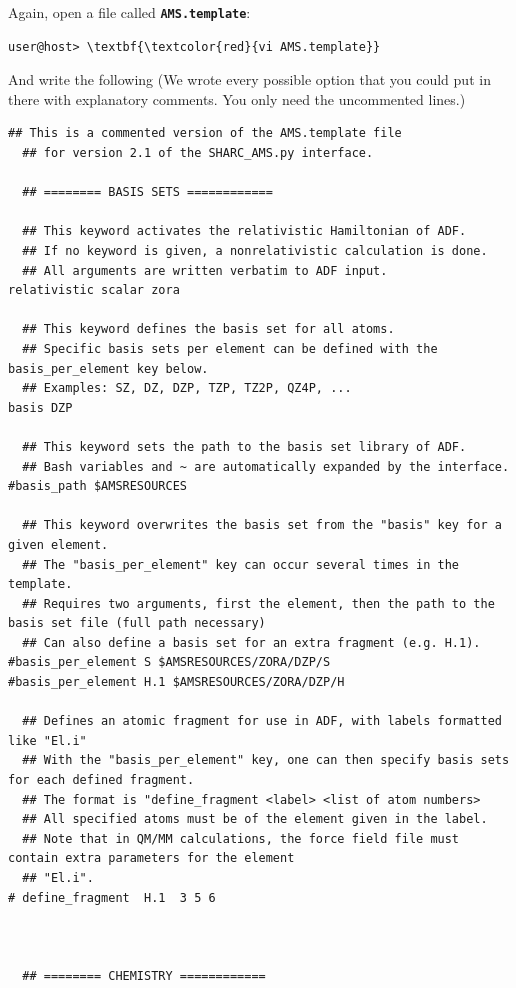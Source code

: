 \documentclass[a4paper,11pt,DIV=15,openany]{scrbook}
\newcommand{\ttt}[1]{\textbf{\texttt{#1}}}
\begin{document}
Again, open a file called \ttt{AMS.template}:
\begin{Verbatim}[commandchars=\\\{\}]
user@host> \textbf{\textcolor{red}{vi AMS.template}}
\end{Verbatim}
And write the following (We wrote every possible option that you could put in there with explanatory comments. You only need the uncommented lines.)
\begin{oframed}
\footnotesize\begin{Verbatim}[commandchars=\\\{\}]
  ## This is a commented version of the AMS.template file 
  ## for version 2.1 of the SHARC_AMS.py interface.

  ## ======== BASIS SETS ============

  ## This keyword activates the relativistic Hamiltonian of ADF.
  ## If no keyword is given, a nonrelativistic calculation is done.
  ## All arguments are written verbatim to ADF input.
relativistic scalar zora

  ## This keyword defines the basis set for all atoms.
  ## Specific basis sets per element can be defined with the basis_per_element key below.
  ## Examples: SZ, DZ, DZP, TZP, TZ2P, QZ4P, ...
basis DZP

  ## This keyword sets the path to the basis set library of ADF.
  ## Bash variables and ~ are automatically expanded by the interface.
#basis_path $AMSRESOURCES

  ## This keyword overwrites the basis set from the "basis" key for a given element.
  ## The "basis_per_element" key can occur several times in the template.
  ## Requires two arguments, first the element, then the path to the basis set file (full path necessary)
  ## Can also define a basis set for an extra fragment (e.g. H.1).
#basis_per_element S $AMSRESOURCES/ZORA/DZP/S
#basis_per_element H.1 $AMSRESOURCES/ZORA/DZP/H

  ## Defines an atomic fragment for use in ADF, with labels formatted like "El.i"
  ## With the "basis_per_element" key, one can then specify basis sets for each defined fragment.
  ## The format is "define_fragment <label> <list of atom numbers>
  ## All specified atoms must be of the element given in the label.
  ## Note that in QM/MM calculations, the force field file must contain extra parameters for the element 
  ## "El.i".
# define_fragment  H.1  3 5 6



  ## ======== CHEMISTRY ============


\end{Verbatim}
\end{oframed}
\end{document}

